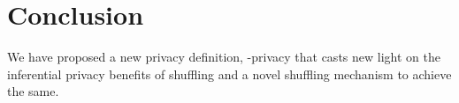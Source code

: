 \section{Conclusion}
We have proposed a new privacy definition, \name-privacy that casts new light on the inferential privacy benefits of shuffling and a novel shuffling mechanism to achieve the same. %



